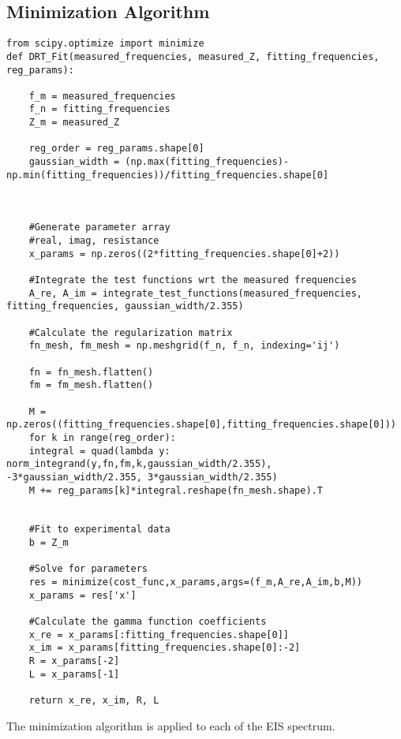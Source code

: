 \documentclass[11pt]{article}
\begin{document}
\subsection{Minimization Algorithm}
\label{sec:org7092583}




\begin{verbatim}
from scipy.optimize import minimize
def DRT_Fit(measured_frequencies, measured_Z, fitting_frequencies, reg_params):

    f_m = measured_frequencies
    f_n = fitting_frequencies
    Z_m = measured_Z

    reg_order = reg_params.shape[0]
    gaussian_width = (np.max(fitting_frequencies)-np.min(fitting_frequencies))/fitting_frequencies.shape[0]



    #Generate parameter array
    #real, imag, resistance
    x_params = np.zeros((2*fitting_frequencies.shape[0]+2))

    #Integrate the test functions wrt the measured frequencies
    A_re, A_im = integrate_test_functions(measured_frequencies, fitting_frequencies, gaussian_width/2.355)

    #Calculate the regularization matrix
    fn_mesh, fm_mesh = np.meshgrid(f_n, f_n, indexing='ij')

    fn = fn_mesh.flatten()
    fm = fm_mesh.flatten()

    M = np.zeros((fitting_frequencies.shape[0],fitting_frequencies.shape[0]))
    for k in range(reg_order):
	integral = quad(lambda y: norm_integrand(y,fn,fm,k,gaussian_width/2.355), -3*gaussian_width/2.355, 3*gaussian_width/2.355)
	M += reg_params[k]*integral.reshape(fn_mesh.shape).T


    #Fit to experimental data
    b = Z_m

    #Solve for parameters
    res = minimize(cost_func,x_params,args=(f_m,A_re,A_im,b,M))
    x_params = res['x']

    #Calculate the gamma function coefficients
    x_re = x_params[:fitting_frequencies.shape[0]]
    x_im = x_params[fitting_frequencies.shape[0]:-2]
    R = x_params[-2]
    L = x_params[-1]

    return x_re, x_im, R, L
\end{verbatim}

The minimization algorithm is applied to each of the EIS spectrum.
\end{document}
